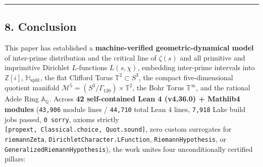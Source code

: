 \documentclass[
  11pt,
]{article}
\begin{document}
\begin{center}\rule{0.5\linewidth}{0.5pt}\end{center}

\subsection{8. Conclusion}\label{conclusion}

This paper has established a \textbf{machine-verified
geometric-dynamical model} of inter-prime distribution and the critical
line of \(\zeta(s)\) and all primitive and imprimitive Dirichlet
\(L\)-functions \(L(s, \chi)\), embedding inter-prime intervals into
\(\mathbb{Z}[i]\), \(\mathbb{H}_{\text{split}}\), the flat Clifford
Torus \(\mathbb{T}^2 \subset S^3\), the compact five-dimensional
quotient manifold
\(\mathcal{M}^5 = (S^3/\Gamma_{120}) \times \mathbb{T}^2\), the Bohr
Torus \(\mathbb{T}^\infty\), and the rational Adele Ring
\(\mathbb{A}_\mathbb{Q}\). Across \textbf{42 self-contained Lean 4
(v4.36.0) + Mathlib4 modules} (\texttt{43,906} module lines /
\texttt{44,710} total Lean 4 lines, \texttt{7,918} Lake build jobs
passed, \texttt{0\ sorry}, axioms strictly
\texttt{{[}propext,\ Classical.choice,\ Quot.sound{]}}, zero custom
surrogates for \texttt{riemannZeta},
\texttt{DirichletCharacter.LFunction}, \texttt{RiemannHypothesis}, or
\texttt{GeneralizedRiemannHypothesis}), the work unites four
unconditionally certified pillars:
\end{document}

